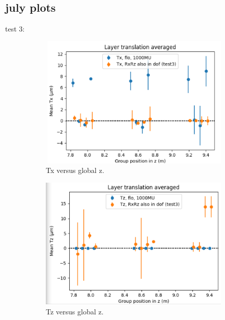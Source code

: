 \subsection{july plots}

test 3:
\begin{figure}
  \centering
  \begin{subfigure}[b]{0.3\textwidth}
    \centering
    \includegraphics[width=\textwidth]{plots/july_28/Tx.png}
    \caption{Tx versus global z.}
  \end{subfigure}
  \hfill
  \begin{subfigure}[b]{0.3\textwidth}
    \centering
    \includegraphics[width=\textwidth]{plots/july_28/Tz.png}
    \caption{Tz versus global z.}
  \end{subfigure}
  \hfill
  \begin{subfigure}[b]{0.3\textwidth}

\end{subfigure}
\end{figure}
